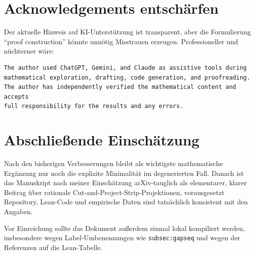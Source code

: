 \documentclass[11pt]{article}
\begin{document}
\section{Acknowledgements entschärfen}

Der aktuelle Hinweis auf KI-Unterstützung ist transparent, aber die Formulierung ``proof construction'' könnte unnötig Misstrauen erzeugen. Professioneller und nüchterner wäre:

\begin{lstlisting}[language={[LaTeX]TeX}]
The author used ChatGPT, Gemini, and Claude as assistive tools during
mathematical exploration, drafting, code generation, and proofreading.
The author has independently verified the mathematical content and accepts
full responsibility for the results and any errors.
\end{lstlisting}

\section{Abschließende Einschätzung}

Nach den bisherigen Verbesserungen bleibt als wichtigste mathematische Ergänzung nur noch die explizite Minimalität im degenerierten Fall. Danach ist das Manuskript nach meiner Einschätzung arXiv-tauglich als elementarer, klarer Beitrag über rationale Cut-and-Project-Strip-Projektionen, vorausgesetzt Repository, Lean-Code und empirische Daten sind tatsächlich konsistent mit den Angaben.

Vor Einreichung sollte das Dokument außerdem einmal lokal kompiliert werden, insbesondere wegen Label-Umbenennungen wie \texttt{subsec:gapseq} und wegen der Referenzen auf die Lean-Tabelle.
\end{document}
